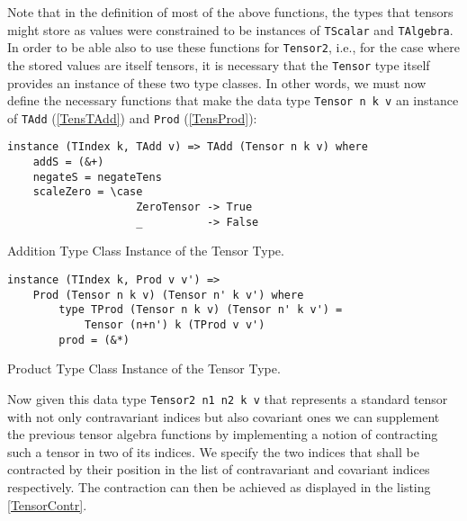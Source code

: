 Note that in the definition of most of the above functions, the types that tensors might store as values were constrained to be instances of \texttt{TScalar} and \texttt{TAlgebra}. 
In order to be able also to use these functions for  \texttt{Tensor2}, i.e., for the case where the stored values are itself tensors, it is necessary that the \texttt{Tensor} type itself provides an instance of these two type classes. In other words, we must now define the necessary functions that make the data type
\texttt{Tensor n k v} an instance of \texttt{TAdd} (\ref{TensTAdd}) and \texttt{Prod} (\ref{TensProd}):

\begin{listing}[hbt!] 
\begin{verbatim}
instance (TIndex k, TAdd v) => TAdd (Tensor n k v) where
    addS = (&+)
    negateS = negateTens
    scaleZero = \case
                    ZeroTensor -> True
                    _          -> False
\end{verbatim}
\caption{Addition Type Class Instance of the Tensor Type.}\label{TensTAdd}
\end{listing}

\begin{listing}[hbt!]
\begin{verbatim}
instance (TIndex k, Prod v v') => 
    Prod (Tensor n k v) (Tensor n' k v') where
        type TProd (Tensor n k v) (Tensor n' k v') = 
            Tensor (n+n') k (TProd v v')
        prod = (&*)
\end{verbatim} 
\caption{Product Type Class Instance of the Tensor Type.}\label{TensProd}
\end{listing}

Now given this data type \texttt{Tensor2 n1 n2 k v} that represents a standard tensor with not only contravariant indices but also covariant ones we can supplement the previous tensor algebra functions by implementing a notion of contracting such a tensor in two of its indices.
We specify the two indices that shall be contracted by their position in the list of contravariant and covariant indices respectively. The contraction can then be achieved as displayed in the listing \ref{TensorContr}.

